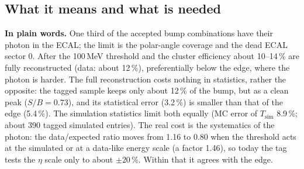 \documentclass[11pt,a4paper]{article}
\begin{document}
\subsection{What it means and what is needed}
\label{sec:ecalacc-need}
\textbf{In plain words.} One third of the accepted bump combinations have their photon in the ECAL; the limit is the polar-angle coverage and the dead
ECAL sector 0. After the 100\,MeV threshold and the cluster efficiency about 10--14\,\% are fully reconstructed (data: about 12\,\%), preferentially
below the edge, where the photon is harder. The full reconstruction costs nothing in statistics, rather the opposite: the tagged sample keeps only
about 12\,\% of the bump, but as a clean peak ($S/B=0.73$), and its statistical error (3.2\,\%) is smaller than that of the edge (5.4\,\%). The
simulation statistics limit both equally (MC error of $T_{\mathrm{sim}}$ 8.9\,\%; about 390 tagged simulated entries). The real cost is the
systematics of the photon: the data/expected ratio moves from 1.16 to 0.80 when the threshold acts at the simulated or at a data-like energy scale
(a factor 1.46), so today the tag tests the $\eta$ scale only to about $\pm20$\,\%. Within that it agrees with the edge.
\end{document}
